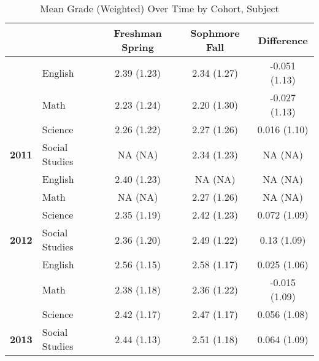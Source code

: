 \begin{table}[!h]

\caption{\label{tab:table_grade_desc}Mean Grade (Weighted) Over Time by Cohort, Subject}
\centering
\begin{tabular}[t]{>{}llccc}
\toprule
 &  & Freshman Spring & Sophmore Fall & Difference\\
\midrule
 & English & 2.39 (1.23) & 2.34 (1.27) & -0.051 (1.13)\\

 & Math & 2.23 (1.24) & 2.20 (1.30) & -0.027 (1.13)\\

 & Science & 2.26 (1.22) & 2.27 (1.26) & 0.016 (1.10)\\

\multirow{-4}{*}{\raggedright\arraybackslash \textbf{2011}} & Social Studies & NA (NA) & 2.34 (1.23) & NA (NA)\\
\cmidrule{1-5}
 & English & 2.40 (1.23) & NA (NA) & NA (NA)\\

 & Math & NA (NA) & 2.27 (1.26) & NA (NA)\\

 & Science & 2.35 (1.19) & 2.42 (1.23) & 0.072 (1.09)\\

\multirow{-4}{*}{\raggedright\arraybackslash \textbf{2012}} & Social Studies & 2.36 (1.20) & 2.49 (1.22) & 0.13 (1.09)\\
\cmidrule{1-5}
 & English & 2.56 (1.15) & 2.58 (1.17) & 0.025 (1.06)\\

 & Math & 2.38 (1.18) & 2.36 (1.22) & -0.015 (1.09)\\

 & Science & 2.42 (1.17) & 2.47 (1.17) & 0.056 (1.08)\\

\multirow{-4}{*}{\raggedright\arraybackslash \textbf{2013}} & Social Studies & 2.44 (1.13) & 2.51 (1.18) & 0.064 (1.09)\\
\bottomrule
\end{tabular}
\end{table}
